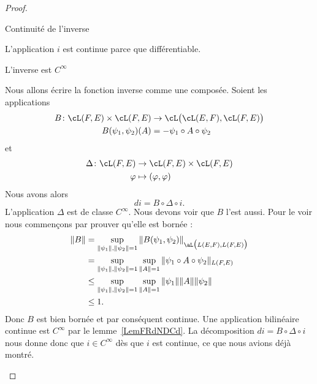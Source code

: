 \begin{proof}
\begin{subproof}
    \item[Continuité de l'inverse]

        L'application \( i\) est continue parce que différentiable.
    \item[L'inverse est \(  C^{\infty}\)]

        Nous allons écrire la fonction inverse comme une composée. Soient les applications
        \begin{equation}
            \begin{aligned}
                B\colon \cL(F,E)\times \cL(F,E)&\to \cL\big( \cL(E,F),\cL(F,E) \big) \\
                B(\psi_1,\psi_2)(A)&= -\psi_1\circ A\circ\psi_2
            \end{aligned}
        \end{equation}
        et
        \begin{equation}
            \begin{aligned}
                \Delta\colon \cL(F,E)&\to \cL(F,E)\times \cL(F,E) \\
                \varphi&\mapsto (\varphi,\varphi)
            \end{aligned}
        \end{equation}
        Nous avons alors
        \begin{equation}
            di=B\circ\Delta\circ i.
        \end{equation}
        L'application \( \Delta\) est de classe \(  C^{\infty}\). Nous devons voir que \( B\) l'est aussi. Pour le voir nous commençons par prouver qu'elle est bornée :
        \begin{equation}
            \begin{aligned}[]
                \| B \|&=\sup_{\| \psi_1 \|,\| \psi_2 \|=1}\| B(\psi_1,\psi_2) \|_{\aL\big( L(E,F),L(F,E) \big)}\\
                &=\sup_{  \| \psi_1 \|,\| \psi_2 \|=1 }\sup_{\| A \|=1}\| \psi_1\circ A\circ\psi_2 \|_{L(F,E)}\\
                &\leq \sup_{\| \psi_1 \|,\| \psi_2 \|=1}\sup_{\| A \|=1}\| \psi_1 \|\| A \|\| \psi_2 \|\\
                &\leq 1.
            \end{aligned}
        \end{equation}
        Donc \( B\) est bien bornée et par conséquent continue. Une application bilinéaire continue est \(  C^{\infty}\) par le lemme~\ref{LemFRdNDCd}. La décomposition \( di=B\circ \Delta\circ i\) nous donne donc que \( i\in C^{\infty}\) dès que \( i\) est continue, ce que nous avions déjà montré.
        \end{subproof}
\end{proof}



